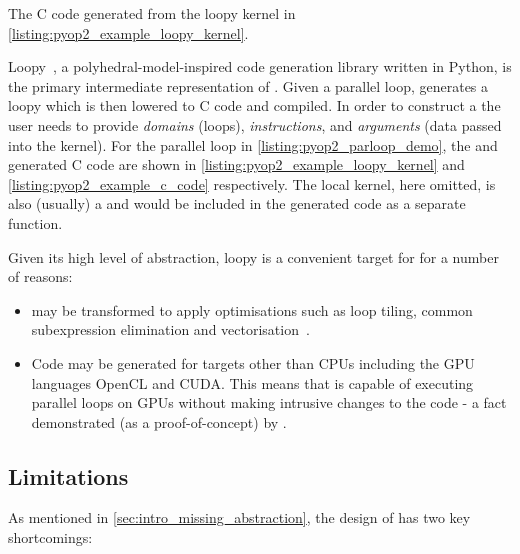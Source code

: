 \documentclass[thesis]{subfiles}
\begin{document}
\begin{listing}
  \centering
  \begin{minipage}{.9\textwidth}
    \inputminted{c}{./scripts/artefacts/pyop2_example_c_code_tidy.c}
  \end{minipage}
  \caption{
    The C code generated from the loopy kernel in \cref{listing:pyop2_example_loopy_kernel}.
  }
  \label{listing:pyop2_example_c_code}
\end{listing}

Loopy~\cite{klocknerLooPyTransformationbased2014}, a polyhedral-model-inspired code generation library written in Python, is the primary intermediate representation of .
Given a parallel loop,  generates a loopy  which is then lowered to C code and compiled.
In order to construct a  the user needs to provide \emph{domains} (loops), \emph{instructions}, and \emph{arguments} (data passed into the kernel).
For the parallel loop in \cref{listing:pyop2_parloop_demo}, the  and generated C code are shown in \cref{listing:pyop2_example_loopy_kernel} and \cref{listing:pyop2_example_c_code} respectively.
The local kernel, here omitted, is also (usually) a  and would be included in the generated code as a separate function.

Given its high level of abstraction, loopy is a convenient target for  for a number of reasons:

\begin{itemize}
  \item
     may be transformed to apply optimisations such as loop tiling, common subexpression elimination and vectorisation~\cite{sunStudyVectorizationMatrixfree2020}.
  \item
    Code may be generated for targets other than CPUs including the GPU languages OpenCL and CUDA.
    This means that  is capable of executing parallel loops on GPUs without making intrusive changes to the code - a fact demonstrated (as a proof-of-concept) by \cite{fenics2021-kulkarni}.
\end{itemize}

\subsection{Limitations}
\label{sec:pyop2_limitations}

As mentioned in \cref{sec:intro_missing_abstraction}, the design of  has two key shortcomings:
\end{document}
